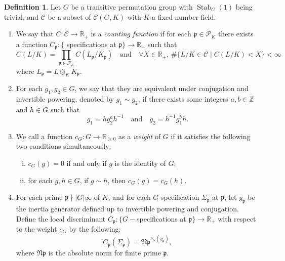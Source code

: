 \documentclass[12pt,a4paper]{amsart}
\numberwithin{equation}{section}%
\theoremstyle{plain}%
\theoremstyle{definition}%
\newtheorem{definition}[theorem]{Definition}%
\theoremstyle{remark}%
\begin{document}
	\begin{definition}\label{def: generalized discriminant}
		Let $G$ be a transitive permutation group with $\operatorname{Stab}_{G}(1)$ being trivial, and $\mathcal{C}$ be a subset of $\mathcal{C}(G,K)$ with $K$ a fixed number field.
		\begin{enumerate}
			\item We say that $C:\mathcal{C}\to\mathbb{R}_+$ is a \emph{counting function} if for each $\mathfrak{p}\in\mathcal{P}_K$ there exists a function $C_{\mathfrak{p}}:\{$ specifications at $\mathfrak{p}\}\to\mathbb{R}_{+}$ such that
			\begin{equation*}
				C(L/K)=\prod_{\mathfrak{p}\in\mathcal{P}_K}C(L_{\mathfrak{p}}/K_{\mathfrak{p}})
				\quad\text{and}\quad
				\forall X\in\mathbb{R}_+,\,\#\{L/K\in\mathcal{C}\mid C(L/K)<X\}<\infty
			\end{equation*}
			where $L_{\mathfrak{p}}=L\otimes_K K_{\mathfrak{p}}$.
			\item For each $g_{1},g_{2}\in G$, we say that they are equivalent under conjugation and invertible powering, denoted by $g_{1}\sim g_{2}$, if there exists some integers $a,b\in\mathbb{Z}$ and $h\in G$ such that
			\begin{equation*}
				g_{1}=hg_{2}^{a}h^{-1}\quad\text{and}\quad g_{2}=h^{-1}g_{1}^{b}h.
			\end{equation*}
			\item We call a function $c_G:G\to\mathbb{R}_{\geq0}$ as a \emph{weight} of $G$ if it satisfies the following two conditions simultaneously:
			\begin{enumerate}[(i)]
				\item $c_G(g)=0$ if and only if $g$ is the identity of $G$;
				\item for each $g,h\in G$, if $g\sim h$, then $c_{G}(g)=c_{G}(h)$.
			\end{enumerate} 
			\item For each prime $\mathfrak{p}\nmid\lvert G\rvert\infty$ of $K$, and for each $G$-specification $\Sigma_{\mathfrak{p}}$ at $\mathfrak{p}$, let $y_{\mathfrak{p}}$ be the inertia generator defined up to invertible powering and conjugation.
			Define the local discriminant $C_{\mathfrak{p}}:\{G-$specifications at $\mathfrak{p}\}\to\mathbb{R}_{+}$ with respect to the weight $c_G$ by the following:
			\begin{equation*}
				C_{\mathfrak{p}}(\Sigma_{\mathfrak{p}})=\mathfrak{Np}^{c_{G}(y_{\mathfrak{p}})},
			\end{equation*}
			where $\mathfrak{Np}$ is the absolute norm for finite prime $\mathfrak{p}$.

\end{enumerate}
\end{definition}
\end{document}
